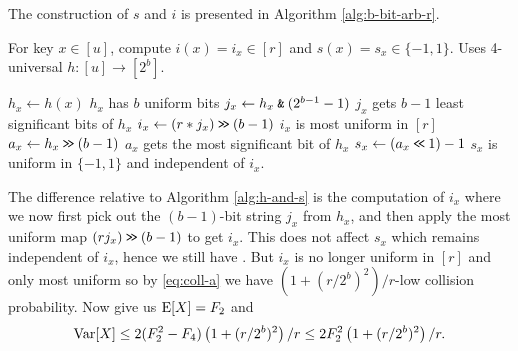 The construction of $s$ and $i$ is presented in Algorithm \ref{alg:b-bit-arb-r}.
\begin{algorithm}[H]
   \caption{For key $x\in [u]$, compute $i(x)=i_x\in[r]$ and $s(x)=s_x\in\{-1,1\}$.
   \newline
   Uses 4-universal $h:[u]\to [2^b]$.}
   \label{alg:b-bit-arb-r}
   \begin{algorithmic}
      \State $h_x\gets h(x)$
      \Comment $h_x$ has $b$ uniform bits
      \State $j_x\gets h_x\mathbin{\texttt{\&}}(2^{b-1}-1)$
      \Comment $j_x$ gets $b-1$ least significant bits of $h_x$
      \State $i_x\gets (r*j_x)\mathbin{\texttt{>\!>}} (b-1)$
      \Comment $i_x$ is most uniform in $[r]$
      \State $a_x\gets h_x\mathbin{\texttt{>\!>}} (b-1)$
      \Comment $a_x$ gets the most significant bit of $h_x$
      \State $s_x\gets (a_x\mathbin{\texttt{<\!<}} 1)-1$
      \Comment $s_x$ is uniform in $\{-1,1\}$ and independent of $i_x$.
   \end{algorithmic}
\end{algorithm}
The difference relative to Algorithm \ref{alg:h-and-s} is the computation of $i_x$ where we now first pick out the $(b-1)$-bit string $j_x$ from $h_x$, and then apply the most uniform map $(rj_x)\mathbin{\texttt{>\!>}} (b-1)$ to get $i_x$.
This does not affect $s_x$ which remains independent of $i_x$, hence we still have .
But $i_x$ is no longer uniform in $[r]$ and only most uniform so by \eqref{eq:coll-a} we have $(1 + (r/2^b)^2)/r$-low collision probability.
Now  give us $\operatorname*{E}[X] = F_2$ and
\begin{equation}
   \label{eq:Var-b-bit-arb-r} \operatorname*{Var}[X] \le 2(F_2^2 - F_4)\left(1+(r/2^b)^2\right)/r \le 2 F_2^2\left(1 + (r/2^b)^2 \right)/r .
\end{equation}

